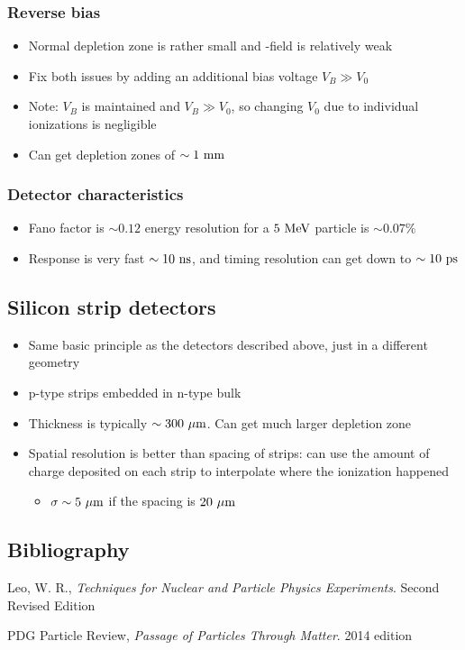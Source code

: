 \subsubsection{Reverse bias}
\begin{itemize}
  \item Normal depletion zone is rather small and \E-field is relatively weak
  \item Fix both issues by adding an additional bias voltage $V_B\gg V_0$
  \item Note: $V_B$ is maintained and $V_B\gg V_0$, so changing $V_0$ due to individual ionizations is negligible
  \item Can get depletion zones of $\sim1~\text{mm}$
\end{itemize}

\subsubsection{Detector characteristics}
\begin{itemize}
  \item Fano factor is $\sim 0.12$ \thus energy resolution for a $5~\text{MeV}$ particle is $\sim 0.07\%$
  \item Response is very fast $\sim 10~\text{ns}$, and timing resolution can get down to $\sim 10~\text{ps}$
\end{itemize}

\subsection{Silicon strip detectors}
\begin{itemize}
  \item Same basic principle as the detectors described above, just in a different geometry
  \item p-type strips embedded in n-type bulk
  \item Thickness is typically $\sim 300~\mu\text{m}$. Can get much larger depletion zone
  \item Spatial resolution is better than spacing of strips: can use the amount of charge deposited on each strip to interpolate where the ionization happened
  \begin{itemize}
    \item \thus $\sigma \sim 5~\mu\text{m}$ if the spacing is $20~\mu\text{m}$
  \end{itemize}
\end{itemize}

\begin{appendices}
\section{Bibliography}

Leo, W. R., \emph{Techniques for Nuclear and Particle Physics Experiments}. Second Revised Edition
\vspace{5mm}

\noindent PDG Particle Review, \emph{Passage of Particles Through Matter}. 2014 edition

\end{appendices}


